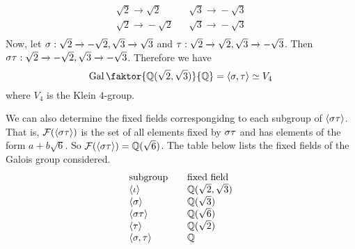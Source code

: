 \begin{example}
\begin{enumerate}
\begin{equation*}
\begin{array}{lcl}
                    \sqrt{2}    \xrightarrow{} \sqrt{2} && \sqrt{3}
                                                \xrightarrow{} -\sqrt{3} \\

                    \sqrt{2}    \xrightarrow{} -\sqrt{2} && \sqrt{3}
                                                \xrightarrow{} -\sqrt{3} \\
                \end{array}
            \end{equation*}
            Now, let $\sigma:\sqrt{2} \xrightarrow{} -\sqrt{2}, \sqrt{3}
            \xrightarrow{} \sqrt{3}$ and $\tau:\sqrt{2} \xrightarrow{} \sqrt{2},
            \sqrt{3} \xrightarrow{} -\sqrt{3}$. Then $\sigma\tau:\sqrt{2}
            \xrightarrow{} -\sqrt{2}, \sqrt{3} \xrightarrow{} -\sqrt{3}$.
            Therefore we have
            \begin{equation*}
                \Gal{\faktor{\Q(\sqrt{2},\sqrt{3})}{\Q}}=\langle \s,\t \rangle
                \simeq V_4
            \end{equation*}
            where $V_4$ is the Klein $4$-group.

            We can also determine the fixed fields correspongidng to each
            subgroup of  $\langle \sigma \tau \rangle$. That is, $\mathcal{F}(\langle \sigma\tau
            \rangle)$ is the set of all elements fixed by $\sigma\tau$ and has
            elements of the form  $a+b\sqrt{6}$. So $\mathcal{F}(\langle \sigma\tau
            \rangle)=\mathbb{Q}(\sqrt{6})$. The table below lists the fixed fields of
            the Galois group considered.
            \begin{equation*}
                \begin{array}{lcl}
                    \text{subgroup}    &&   \text{fixed field}   \\
                    \langle \iota \rangle  &&   \mathbb{Q}(\sqrt{2},\sqrt{3})   \\
                    \langle \sigma \rangle  &&   \mathbb{Q}(\sqrt{3})   \\
                    \langle \sigma\tau \rangle  &&   \mathbb{Q}(\sqrt{6})   \\
                    \langle \tau \rangle  &&   \mathbb{Q}(\sqrt{2})   \\
                    \langle \sigma,\tau \rangle  &&   \mathbb{Q}   \\
                \end{array}
            \end{equation*}


\end{enumerate}
\end{example}
